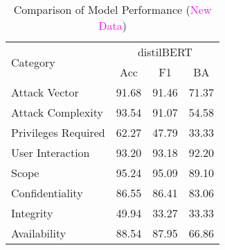 \documentclass{article}
\begin{document}
\begin{table}[h!]
	\centering
	\small
	\begin{tabular}{|l|ccc|}
		\hline
		\multirow{2}{*}{Category} & \multicolumn{3}{c|}{distilBERT }                 \\
		\cline{2-4}
		                          & Acc                              & F1    & BA    \\
		\hline
		Attack Vector             & 91.68                            & 91.46 & 71.37 \\
		Attack Complexity         & 93.54                            & 91.07 & 54.58 \\
		Privileges Required       & 62.27                            & 47.79 & 33.33 \\
		User Interaction          & 93.20                            & 93.18 & 92.20 \\
		Scope                     & 95.24                            & 95.09 & 89.10 \\
		Confidentiality           & 86.55                            & 86.41 & 83.06 \\
		Integrity                 & 49.94                            & 33.27 & 33.33 \\
		Availability              & 88.54                            & 87.95 & 66.86 \\
		\hline
	\end{tabular}
	\caption{Comparison of Model Performance
		(\textcolor{magenta}{New Data})}
	\label{tab:model_performance}
\end{table}
\end{document}
